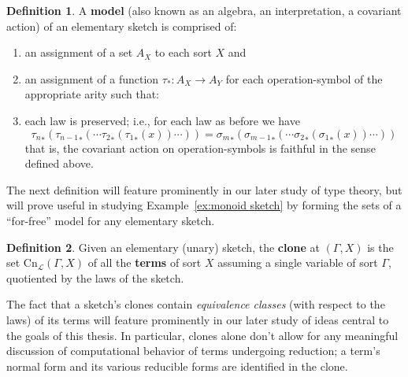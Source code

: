 \documentclass[12pt,twoside]{reedthesis}
\theoremstyle{definition}
\newtheorem{definition}{Definition}
\theoremstyle{remark}
\theoremstyle{plain}
\begin{document}
\begin{definition}\label{def:model}
  A \textbf{model} (also known as an algebra, an interpretation, a covariant
  action) of an elementary sketch is comprised of:
  \begin{enumerate}
    \item an assignment of a set $A_X$ to each sort $X$ and
    \item an assignment of a function $\tau_* : A_X \rightarrow A_Y$ for each
    operation-symbol of the appropriate arity such that:
    \item each law is preserved; i.e., for each law as before we have
    \[ {\tau_n}_* ({\tau_{n-1}}_* (\cdots {\tau_2}_* ({\tau_1}_* (x))\cdots )) = {\sigma_m}_* ({\sigma_{m-1}}_*(\cdots {\sigma_2}_* ({\sigma_1}_* (x))\cdots )) \]
    that is, the covariant action on operation-symbols is faithful in
    the sense defined above.
  \end{enumerate}
\end{definition}

The next definition will feature prominently in our later study of type theory,
but will prove useful in studying Example~\ref{ex:monoid sketch} by forming the
sets of a ``for-free'' model for any elementary sketch.

\begin{definition}\label{def:clone}
  Given an elementary (unary) sketch, the \textbf{clone} at \( (\Gamma, X) \) is
  the set \( \text{Cn}_{\mathcal{L}} (\Gamma, X) \) of all the \textbf{terms} of sort
  $X$ assuming a single variable of sort $\Gamma$, quotiented by the laws of the
  sketch.
\end{definition}
The fact that a sketch's clones contain \emph{equivalence classes} (with respect
to the laws) of its terms will feature prominently in our later study of ideas
central to the goals of this thesis. In particular, clones alone don't allow for
any meaningful discussion of computational behavior of terms undergoing
reduction; a term's normal form and its various reducible forms are identified
in the clone.
\end{document}
